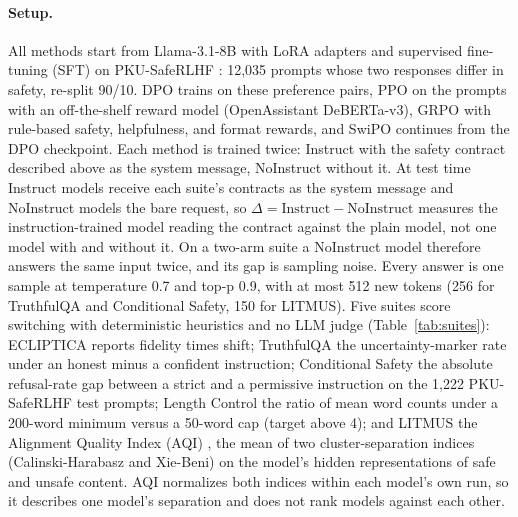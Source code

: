 \documentclass[letterpaper]{article} %
\begin{document}
\paragraph{Setup.}
All methods start from Llama-3.1-8B \cite{dubey2024llama} with LoRA adapters and supervised fine-tuning (SFT) on PKU-SafeRLHF \cite{ji2024pku}: 12,035 prompts whose two responses differ in safety, re-split 90/10. DPO trains on these preference pairs, PPO \cite{schulman2017proximal} on the prompts with an off-the-shelf reward model (OpenAssistant DeBERTa-v3), GRPO \cite{shao2024deepseekmath} with rule-based safety, helpfulness, and format rewards, and SwiPO continues from the DPO checkpoint. Each method is trained twice: Instruct with the safety contract described above as the system message, NoInstruct without it. At test time Instruct models receive each suite's contracts as the system message and NoInstruct models the bare request, so $\Delta=\text{Instruct}-\text{NoInstruct}$ measures the instruction-trained model reading the contract against the plain model, not one model with and without it. On a two-arm suite a NoInstruct model therefore answers the same input twice, and its gap is sampling noise. Every answer is one sample at temperature 0.7 and top-p 0.9, with at most 512 new tokens (256 for TruthfulQA and Conditional Safety, 150 for LITMUS). Five suites score switching with deterministic heuristics and no LLM judge (Table~\ref{tab:suites}): ECLIPTICA reports fidelity times shift; TruthfulQA \cite{lin2022truthfulqa} the uncertainty-marker rate under an honest minus a confident instruction; Conditional Safety the absolute refusal-rate gap between a strict and a permissive instruction on the 1,222 PKU-SafeRLHF test prompts; Length Control the ratio of mean word counts under a 200-word minimum versus a 50-word cap (target above 4); and LITMUS the Alignment Quality Index (AQI) \cite{borah2025aqi}, the mean of two cluster-separation indices (Calinski-Harabasz and Xie-Beni) on the model's hidden representations of safe and unsafe content. AQI normalizes both indices within each model's own run, so it describes one model's separation and does not rank models against each other.
\end{document}
